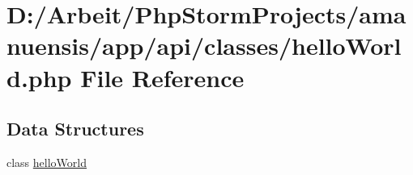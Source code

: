 \hypertarget{hello_world_8php}{}\section{D\+:/\+Arbeit/\+Php\+Storm\+Projects/amanuensis/app/api/classes/hello\+World.php File Reference}
\label{hello_world_8php}
\subsection*{Data Structures}
\begin{DoxyCompactItemize}
\item 
class \hyperlink{classhello_world}{hello\+World}
\end{DoxyCompactItemize}
